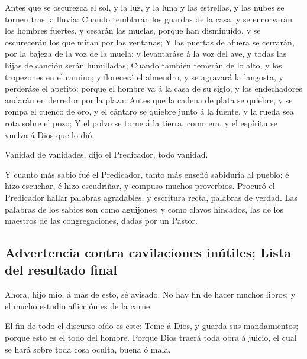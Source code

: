  Antes que se oscurezca el sol, y la luz, y la luna y las
estrellas, y las nubes se tornen tras la lluvia:  Cuando
temblarán los guardas de la casa, y se encorvarán los hombres fuertes, y
cesarán las muelas, porque han disminuído, y se oscurecerán los que
miran por las ventanas;  Y las puertas de afuera se
cerrarán, por la bajeza de la voz de la muela; y levantaráse á la voz
del ave, y todas las hijas de canción serán humilladas; 
Cuando también temerán de lo alto, y los tropezones en el camino; y
florecerá el almendro, y se agravará la langosta, y perderáse el
apetito: porque el hombre va á la casa de su siglo, y los endechadores
andarán en derredor por la plaza:  Antes que la cadena de
plata se quiebre, y se rompa el cuenco de oro, y el cántaro se quiebre
junto á la fuente, y la rueda sea rota sobre el pozo;  Y
el polvo se torne á la tierra, como era, y el espíritu se vuelva á Dios
que lo dió.

 Vanidad de vanidades, dijo el Predicador, todo vanidad.

 Y cuanto más sabio fué el Predicador, tanto más enseñó
sabiduría al pueblo; é hizo escuchar, é hizo escudriñar, y compuso
muchos proverbios.  Procuró el Predicador hallar palabras
agradables, y escritura recta, palabras de verdad.  Las
palabras de los sabios son como aguijones; y como clavos hincados, las
de los maestros de las congregaciones, dadas por un Pastor.

\hypertarget{advertencia-contra-cavilaciones-inuxfatiles-lista-del-resultado-final}{%
\subsection{Advertencia contra cavilaciones inútiles; Lista del
resultado
final}\label{advertencia-contra-cavilaciones-inuxfatiles-lista-del-resultado-final}}

 Ahora, hijo mío, á más de esto, sé avisado. No hay fin
de hacer muchos libros; y el mucho estudio aflicción es de la carne.

 El fin de todo el discurso oído es este: Teme á Dios, y
guarda sus mandamientos; porque esto es el todo del hombre.
 Porque Dios traerá toda obra á juicio, el cual se hará
sobre toda cosa oculta, buena ó mala.
